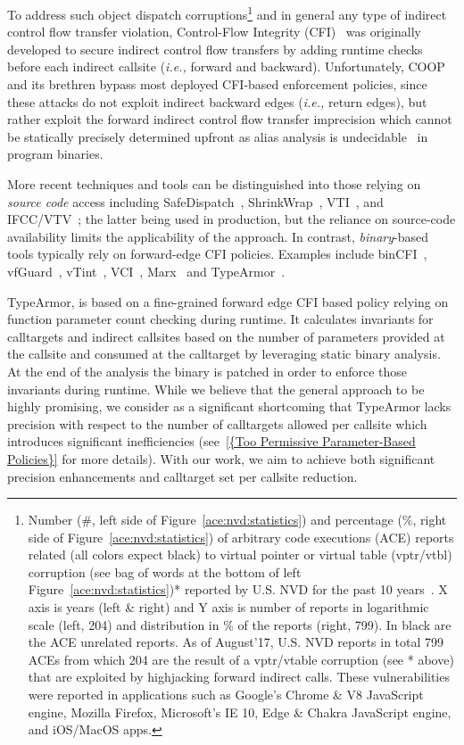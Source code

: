 To address such object dispatch corruptions\footnote{Number (\#, left side of Figure~\ref{ace:nvd:statistics}) and percentage (\%, right side of Figure~\ref{ace:nvd:statistics}) 
of arbitrary code executions (ACE) reports related (all colors expect black) to virtual pointer or virtual table (vptr/vtbl) corruption 
(see bag of words at the bottom of left Figure~\ref{ace:nvd:statistics})* reported by U.S. NVD for the past 10 years~\cite{NVD:ACE}. 
X axis is years (left \& right) and Y axis is number of reports in logarithmic scale (left, 204) and distribution in \% of the reports (right, 799).
In black are the ACE unrelated reports.
As of August'17, U.S. NVD reports in total 799 ACEs from which 204 are the result of a vptr/vtable corruption (see * above) that are exploited by highjacking forward indirect calls.
These vulnerabilities were reported in applications such as Google's Chrome \& V8 JavaScript engine, Mozilla Firefox, Microsoft's IE 10, Edge \& Chakra JavaScript engine, and iOS/MacOS apps.} 
and in general any type of indirect control flow transfer violation, Control-Flow Integrity (CFI)~\cite{abadi:cfi2, abadi:cfi} was originally developed to secure indirect control flow transfers by adding 
runtime checks before each indirect callsite (\textit{i.e.,} forward and backward). Unfortunately, COOP and its brethren bypass most deployed CFI-based enforcement policies, since 
these attacks do not exploit indirect backward edges (\textit{i.e.,} return edges), but rather exploit the forward indirect control flow transfer imprecision which 
cannot be statically precisely determined upfront as alias analysis is undecidable~\cite{alias:undecidable} in program binaries.

More recent techniques and tools can be distinguished into those relying on \textit{source code} access including SafeDispatch~\cite{safedispatch:jang}, ShrinkWrap~\cite{haller:shrinkwrap}, 
VTI~\cite{bounov:interleaving}, and IFCC/VTV~\cite{vtv:tice}; the latter being used in production, but the reliance on source-code availability limits the applicability of the approach. 
In contrast, \textit{binary}-based tools typically rely on forward-edge CFI policies. Examples include binCFI~\cite{ccfir:zhang, zhang:usenix}, vfGuard~\cite{vfuard:aravind}, vTint~\cite{vtint:zhang}, 
VCI~\cite{vci:asiaccs}, Marx~\cite{marx} and TypeArmor~\cite{veen:typearmor}. 

TypeArmor, is based on a fine-grained forward edge CFI based policy relying on function parameter count checking during runtime. It calculates invariants for calltargets and indirect 
callsites based on the number of parameters provided at the callsite and consumed at the calltarget  
by leveraging static binary analysis. At the end of the analysis the binary is patched in order to enforce those invariants during runtime. 
While we believe that the general approach to be highly promising, we consider 
as a significant shortcoming that TypeArmor lacks precision with respect to the number of calltargets allowed per callsite which introduces significant 
inefficiencies (see~\cref{{Too Permissive Parameter-Based Policies}} for more details). 
With our work, we aim to achieve both significant precision enhancements and calltarget set per callsite reduction.

